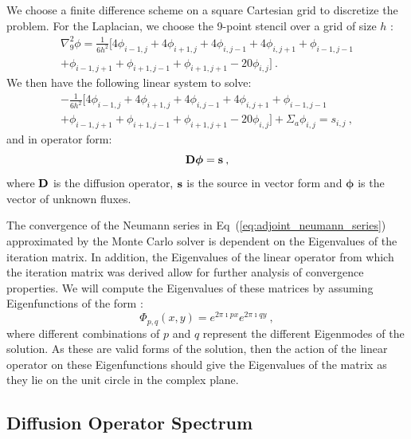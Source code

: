 \documentclass{mc2013}
\begin{document}
We choose a finite difference scheme on a square Cartesian grid to
discretize the problem. For the Laplacian, we choose the 9-point
stencil over a grid of size $h$ \cite{leveque_finite_2007}:
\begin{multline}
  \nabla^2_9\phi = \frac{1}{6h^2}[4 \phi_{i-1,j} + 4 \phi_{i+1,j}
    + 4 \phi_{i,j-1} + 4 \phi_{i,j+1} + \phi_{i-1,j-1}\\ +
    \phi_{i-1,j+1} + \phi_{i+1,j-1} + \phi_{i+1,j+1} - 20
    \phi_{i,j}]\:.
  \label{eq:nine_point_stencil}
\end{multline}
We then have the following linear system to solve:
\begin{multline}
  -\frac{1}{6h^2}[4 \phi_{i-1,j} + 4 \phi_{i+1,j} + 4
    \phi_{i,j-1} + 4 \phi_{i,j+1} + \phi_{i-1,j-1}\\ + \phi_{i-1,j+1}
    + \phi_{i+1,j-1} + \phi_{i+1,j+1} - 20 \phi_{i,j}] + \Sigma_a
  \phi_{i,j} = s_{i,j}\:,
  \label{eq:fd_system}
\end{multline}
and in operator form:
\begin{equation}
  \mathbf{D}\boldsymbol{\phi}=\mathbf{s}\:,
  \label{eq:operator_system}
\end{equation}
where $\mathbf{D}$ is the diffusion operator, $\mathbf{s}$ is the source in
vector form and $\boldsymbol{\phi}$ is the vector of unknown fluxes.

\label{sec:spectral_analysis}

The convergence of the Neumann series in
Eq~(\ref{eq:adjoint_neumann_series}) approximated by the Monte Carlo
solver is dependent on the Eigenvalues of the iteration matrix. In
addition, the Eigenvalues of the linear operator from which the
iteration matrix was derived allow for further analysis of convergence
properties. We will compute the Eigenvalues of these matrices by
assuming Eigenfunctions of the form \cite{leveque_finite_2007}:
\begin{equation}
  \Phi_{p,q}(x,y) = e^{2 \pi \imath p x} e^{2 \pi \imath q y}\:,
  \label{eq:eigenfunction_form}
\end{equation}
where different combinations of $p$ and $q$ represent the different
Eigenmodes of the solution. As these are valid forms of the solution,
then the action of the linear operator on these Eigenfunctions should
give the Eigenvalues of the matrix as they lie on the unit circle in
the complex plane.

\subsection{Diffusion Operator Spectrum}
\label{subsec:diffusion_spectrum}
\end{document}
